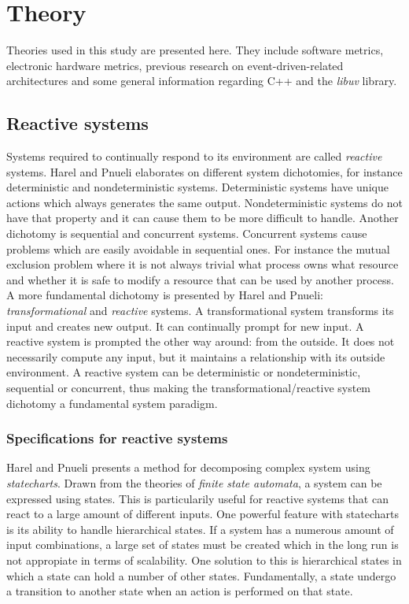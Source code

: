 \chapter{Theory}
\label{cha:theory}

Theories used in this study are presented here. They include software metrics,
electronic hardware metrics, previous research on event-driven-related
architectures and some general information regarding C++ and the \textit{libuv}
library.

\section{Reactive systems}

Systems required to continually respond to its environment are called
\textit{reactive} systems. Harel and Pnueli \cite{harel1985development}
elaborates on different system dichotomies, for instance deterministic and
nondeterministic systems. Deterministic systems have unique actions which
always generates the same output. Nondeterministic systems do not have that
property and it can cause them to be more difficult to handle. Another
dichotomy is sequential and concurrent systems. Concurrent systems cause
problems which are easily avoidable in sequential ones. For instance the mutual
exclusion problem where it is not always trivial what process owns what
resource and whether it is safe to modify a resource that can be used by
another process. A more fundamental dichotomy is presented by Harel and Pnueli:
\textit{transformational} and \textit{reactive} systems. A transformational
system transforms its input and creates new output. It can continually prompt
for new input. A reactive system is prompted the other way around: from the
outside. It does not necessarily compute any input, but it maintains a
relationship with its outside environment. A reactive system can be
deterministic or nondeterministic, sequential or concurrent, thus making the
transformational/reactive system dichotomy a fundamental system paradigm.
\cite{harel1985development}

\subsection{Specifications for reactive systems}

Harel and Pnueli \cite{harel1985development} presents a method for decomposing
complex system using \textit{statecharts}. Drawn from the theories of
\textit{finite state automata}, a system can be expressed using states. This is
particularily useful for reactive systems that can react to a large amount of
different inputs. One powerful feature with statecharts is its ability to
handle hierarchical states. If a system has a numerous amount of input
combinations, a large set of states must be created which in the long run is
not appropiate in terms of scalability. One solution to this is hierarchical
states in which a state can hold a number of other states. Fundamentally, a
state undergo a transition to another state when an action is performed on that
state. \cite{harel1985development}


